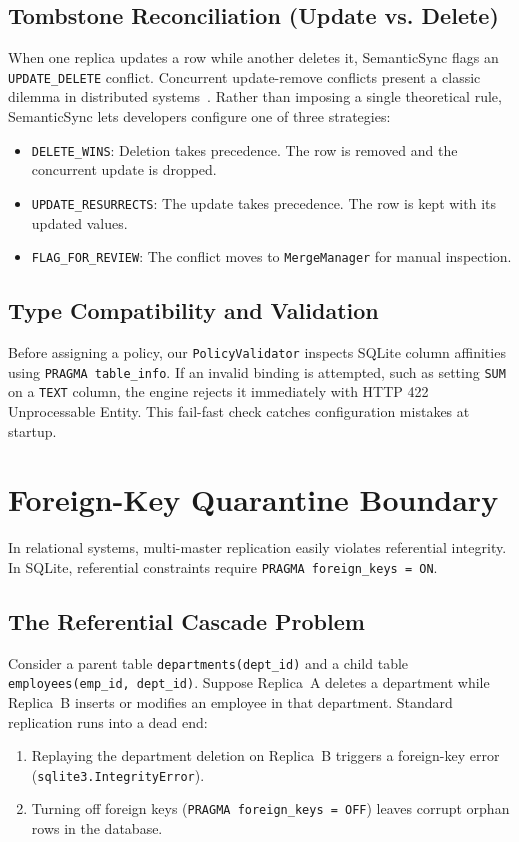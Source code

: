 \documentclass[conference]{IEEEtran}
\begin{document}
\subsection{Tombstone Reconciliation (Update vs. Delete)}
When one replica updates a row while another deletes it, SemanticSync flags an \texttt{UPDATE\_DELETE} conflict. Concurrent update-remove conflicts present a classic dilemma in distributed systems~\cite{removewin2021}. Rather than imposing a single theoretical rule, SemanticSync lets developers configure one of three strategies:
\begin{itemize}
    \item \texttt{DELETE\_WINS}: Deletion takes precedence. The row is removed and the concurrent update is dropped.
    \item \texttt{UPDATE\_RESURRECTS}: The update takes precedence. The row is kept with its updated values.
    \item \texttt{FLAG\_FOR\_REVIEW}: The conflict moves to \texttt{MergeManager} for manual inspection.
\end{itemize}

\subsection{Type Compatibility and Validation}
Before assigning a policy, our \texttt{PolicyValidator} inspects SQLite column affinities using \texttt{PRAGMA table\_info}. If an invalid binding is attempted, such as setting \texttt{SUM} on a \texttt{TEXT} column, the engine rejects it immediately with HTTP 422 Unprocessable Entity. This fail-fast check catches configuration mistakes at startup.

\section{Foreign-Key Quarantine Boundary}

In relational systems, multi-master replication easily violates referential integrity. In SQLite, referential constraints require \texttt{PRAGMA foreign\_keys = ON}.

\subsection{The Referential Cascade Problem}
Consider a parent table \texttt{departments(dept\_id)} and a child table \texttt{employees(emp\_id, dept\_id)}. Suppose Replica~A deletes a department while Replica~B inserts or modifies an employee in that department. Standard replication runs into a dead end:
\begin{enumerate}
    \item Replaying the department deletion on Replica~B triggers a foreign-key error (\texttt{sqlite3.IntegrityError}).
    \item Turning off foreign keys (\texttt{PRAGMA foreign\_keys = OFF}) leaves corrupt orphan rows in the database.
\end{enumerate}
\end{document}
